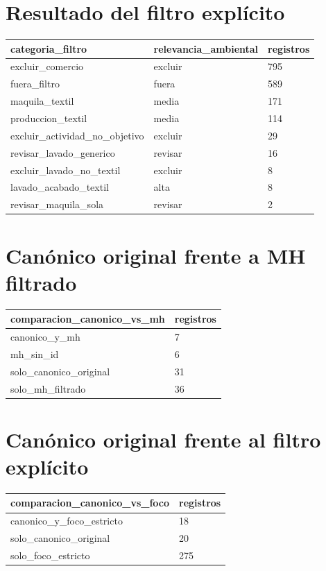 \documentclass[11pt]{article}
\begin{document}
\section{Resultado del filtro explícito}

\begin{tabular}{lll}
\toprule
categoria\_filtro & relevancia\_ambiental & registros \\
\midrule
excluir\_comercio & excluir & 795 \\
fuera\_filtro & fuera & 589 \\
maquila\_textil & media & 171 \\
produccion\_textil & media & 114 \\
excluir\_actividad\_no\_objetivo & excluir & 29 \\
revisar\_lavado\_generico & revisar & 16 \\
excluir\_lavado\_no\_textil & excluir & 8 \\
lavado\_acabado\_textil & alta & 8 \\
revisar\_maquila\_sola & revisar & 2 \\
\bottomrule
\end{tabular}

\section{Canónico original frente a MH filtrado}

\begin{tabular}{ll}
\toprule
comparacion\_canonico\_vs\_mh & registros \\
\midrule
canonico\_y\_mh & 7 \\
mh\_sin\_id & 6 \\
solo\_canonico\_original & 31 \\
solo\_mh\_filtrado & 36 \\
\bottomrule
\end{tabular}

\section{Canónico original frente al filtro explícito}

\begin{tabular}{ll}
\toprule
comparacion\_canonico\_vs\_foco & registros \\
\midrule
canonico\_y\_foco\_estricto & 18 \\
solo\_canonico\_original & 20 \\
solo\_foco\_estricto & 275 \\
\bottomrule
\end{tabular}
\end{document}
